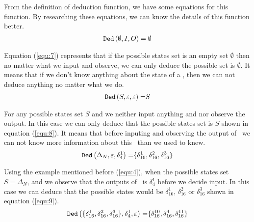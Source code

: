  From the definition of deduction function, we have some equations for this function. By researching these equations, we can know the details of this function better.
\begin{equation}
\begin{split}
{\tt Ded}\left(\emptyset,I,O\right)=\emptyset\\
\end{split}
\label{equ:7}
\end{equation}

Equation (\ref{equ:7}) represents that if the possible states set is an empty set $\emptyset$ then no matter what we input and observe, we can only deduce the possible set is $\emptyset$. It means that if we don't know anything about the state of a \BCN, then we can not deduce anything no matter what we do.
\begin{equation}
\begin{split}
{\tt Ded}\left(S,\varepsilon,\varepsilon\right)=&S\\
\end{split}
\label{equ:8}
\end{equation}

For any possible states set $S$ and we neither input anything and nor observe the output. In this case we can only deduce that the possible states set is $S$ shown in equation (\ref{equ:8}). It means that before inputing and observing the output of \BCN\ we can not know more information about this \BCN\ than we used to knew.
\begin{equation}
\begin{split}
{\tt Ded}\left(\Delta_N,\varepsilon,\delta_4^1\right)=&\{\delta_{16}^1,\delta_{16}^2,\delta_{16}^3\}\\
\end{split}
\label{equ:9}
\end{equation}
 
 Using the example mentioned before (\ref{equ:4}), when the possible states set $S=\Delta_N$, and  we observe that the outputs of \BCN\ is $\delta_4^1$ before we decide input. In this case we can deduce that the possible states would be $\delta_{16}^1$, $\delta_{16}^2$ or  $\delta_{16}^3$ shown in equation (\ref{equ:9}).
\begin{equation}
\begin{split}
{\tt Ded}\left(\{\delta_{16}^1,\delta_{16}^2,\delta_{16}^3\},\delta_4^1,\varepsilon\right)=&\{\delta_{16}^{10},\delta_{16}^4,\delta_{16}^{11}\}\\
\end{split}
\label{equ:10}
\end{equation}

